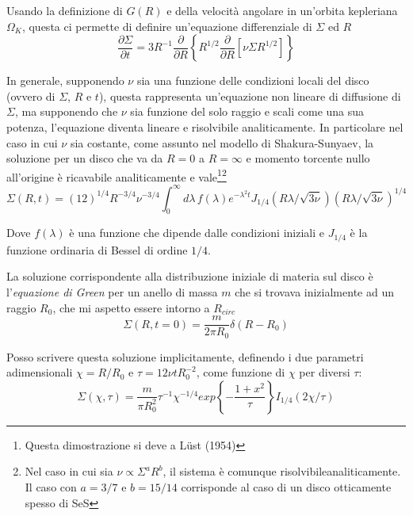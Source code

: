 \documentclass[a4paperbi]{article}
\begin{document}
	Usando la definizione di $G(R)$ e della velocità angolare in un'orbita kepleriana $\Omega_K$,  questa ci permette di definire un'equazione differenziale di $\Sigma$ ed $R$
	\begin{equation}
		\frac{\partial\Sigma}{\partial t}=3R^{-1}\frac{\partial}{\partial R}\left\{R^{1/2}\frac{\partial}{\partial R}\left[\nu\Sigma R^{1/2}\right]\right\}
	\end{equation}
	
	In generale, supponendo $\nu$ sia una funzione delle condizioni locali del disco (ovvero di $\Sigma$, $R$ e $t$), questa rappresenta un'equazione non lineare di diffusione di $\Sigma$, ma supponendo che $\nu$ sia funzione del solo raggio e scali come una sua potenza, l'equazione diventa lineare e risolvibile analiticamente. In particolare nel caso in cui $\nu$ sia costante, come assunto nel modello di Shakura-Sunyaev, la soluzione per un disco che va da $R=0$ a $R=\infty$ e momento torcente nullo all'origine è ricavabile analiticamente e vale\footnote{Questa dimostrazione si deve a Lüst (1954)}\footnote{Nel caso in cui sia $\nu\propto\Sigma^aR^b$, il sistema è comunque risolvibileanaliticamente. Il caso con $a=3/7$ e $b=15/14$ corrisponde al caso di un disco otticamente spesso di SeS}
	\begin{equation}
		\Sigma(R,t)=(12)^{1/4}R^{-3/4}\nu^{-3/4}\int^{\infty}_0d\lambda\,f(\lambda)e^{-\lambda^2t}J_{1/4}(R\lambda/\sqrt{3\nu})(R\lambda/\sqrt{3\nu})^{1/4}
	\end{equation}
	
	Dove $f(\lambda)$ è una funzione che dipende dalle condizioni iniziali e $J_{1/4}$ è la funzione ordinaria di Bessel di ordine $1/4$.
	
	La soluzione corrispondente alla distribuzione iniziale di materia sul disco è l'\textit{equazione di Green} per un anello di massa $m$ che si trovava inizialmente ad un raggio $R_0$, che mi aspetto essere intorno a $R_{circ}$
	\begin{equation}
		\Sigma(R,t=0)=\frac{m}{2\pi R_0}\delta(R-R_0)
	\end{equation}
	
	Posso scrivere questa soluzione implicitamente, definendo i due parametri adimensionali $\chi=R/R_0$ e $\tau=12\nu tR_0^{-2}$, come funzione di $\chi$ per diversi $\tau$:
	\begin{equation}
	\Sigma(\chi,\tau)=\frac{m}{\pi R_0^2}\tau^{-1}\chi^{-1/4}exp\left\{-\frac{1+x^2}{\tau}\right\}I_{1/4}(2\chi/\tau)
	\end{equation}
	
\end{document}
